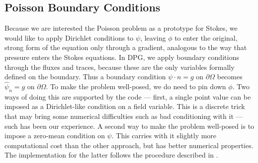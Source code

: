 \subsection{Poisson Boundary Conditions}\label{NVR:sec:poissonBCs}
Because we are interested the Poisson problem as a prototype for Stokes, we would like to apply Dirichlet conditions to $\psi$, leaving $\phi$ to enter the original, strong form of the equation only through a gradient, analogous to the way that pressure enters the Stokes equations.  In DPG, we apply boundary conditions through the fluxes and traces, because these are the only variables formally defined on the boundary.  Thus a boundary condition $\psi \cdot n=g$ on $\partial \Omega$ becomes $\widehat{\psi}_{n}=g$ on $\partial \Omega$.  To make the problem well-posed, we do need to pin down $\phi$.  Two ways of doing this are supported by the code --- first, a single point value can be imposed as a Dirichlet-like condition on a field variable.  This is a discrete trick that may bring some numerical difficulties such as bad conditioning with it --- such has been our experience.  A second way to make the problem well-posed is to impose a zero-mean condition on $\psi$.  This carries with it slightly more computational cost than the other approach, but has better numerical properties.  The implementation for the latter follows the procedure described in \cite{BochevLehoucq}.

